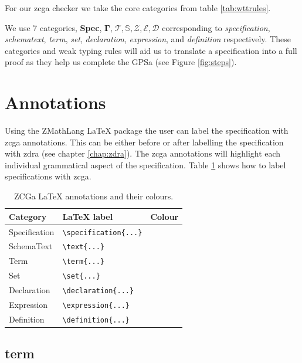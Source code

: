 For our \gls{zcga} checker we take the core categories from table
\ref{tab:wttrules}.

We use 7 categories, \textbf{Spec}, $\mathbf{\Gamma}$, $\mathcal{T}, \mathbb{S},
\mathcal{Z}, \mathcal{E}, \mathcal{D} $ corresponding to \textit{specification},
\textit{schematext}, \textit{term}, \textit{set}, \textit{declaration},
\textit{expression}, and \textit{definition} respectively. These categories and
weak typing rules will aid us to translate a specification into a full proof as
they help us complete the GPSa (see Figure \ref{fig:steps}).

\section{Annotations}

Using the ZMathLang \LaTeX{} package the user can label the specification with
\gls{zcga} annotations. This can be either before or after labelling the
specification with \gls{zdra} (see chapter \ref{chap:zdra}). The \gls{zcga}
annotations will highlight each individual grammatical aspect of the
specification. Table \ref{tab:zcgannot} shows how to label specifications with
\gls{zcga}.

\begin{table}[H]
\begin{tabular}{| l | l | l |}
\hline
\textbf{Category} & \textbf{\LaTeX{} label} & \textbf{Colour} \\
\hline
\hline
Specification & \verb|\specification{...}| & \specification{} \\
SchemaText & \verb|\text{...}| & \cgatext{} \\
Term & \verb|\term{...}| & \term{} \\
Set & \verb|\set{...}| & \set{} \\
Declaration & \verb|\declaration{...}| & \declaration{} \\
Expression & \verb|\expression{...}| & \expression{} \\
Definition & \verb|\definition{...}| & {} \\
\hline
\end{tabular}
\caption{ZCGa \LaTeX{} annotations and their colours. \label{tab:zcgannot}}
\end{table}

\subsection{term}

